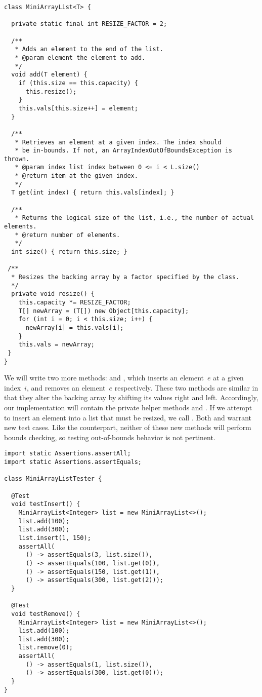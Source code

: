 \enlargethispage{-2\baselineskip}
\begin{lstlisting}[language=MyJava]
class MiniArrayList<T> {

  private static final int RESIZE_FACTOR = 2;

  /**
   * Adds an element to the end of the list.
   * @param element the element to add.
   */
  void add(T element) {
    if (this.size == this.capacity) { 
      this.resize(); 
    }
    this.vals[this.size++] = element;
  }

  /**
   * Retrieves an element at a given index. The index should
   * be in-bounds. If not, an ArrayIndexOutOfBoundsException is thrown.
   * @param index list index between 0 <= i < L.size()
   * @return item at the given index.
   */
  T get(int index) { return this.vals[index]; }

  /**
   * Returns the logical size of the list, i.e., the number of actual elements.
   * @return number of elements.
   */
  int size() { return this.size; }

 /**
  * Resizes the backing array by a factor specified by the class.
  */
  private void resize() {
    this.capacity *= RESIZE_FACTOR;
    T[] newArray = (T[]) new Object[this.capacity];
    for (int i = 0; i < this.size; i++) { 
      newArray[i] = this.vals[i]; 
    }
    this.vals = newArray;
 }
}
\end{lstlisting}

We will write two more methods:  and , which inserts an element~$e$ at a given index~$i$, and removes an element~$e$ respectively. 
These two methods are similar in that they alter the backing array by shifting its values right and left. 
Accordingly, our implementation will contain the private helper methods  and . 
If we attempt to insert an element into a list that must be resized, we call . 
Both  and  warrant new test cases.
Like the  counterpart, neither of these new methods will perform bounds checking, so testing out-of-bounds behavior is not pertinent.

\begin{lstlisting}[language=MyJava]
import static Assertions.assertAll;
import static Assertions.assertEquals;

class MiniArrayListTester {

  @Test
  void testInsert() {
    MiniArrayList<Integer> list = new MiniArrayList<>();
    list.add(100);
    list.add(300);
    list.insert(1, 150);
    assertAll(
      () -> assertEquals(3, list.size()),
      () -> assertEquals(100, list.get(0)),
      () -> assertEquals(150, list.get(1)),
      () -> assertEquals(300, list.get(2)));
  }

  @Test
  void testRemove() {
    MiniArrayList<Integer> list = new MiniArrayList<>();
    list.add(100);
    list.add(300);
    list.remove(0);
    assertAll(
      () -> assertEquals(1, list.size()),
      () -> assertEquals(300, list.get(0)));
  }
}
\end{lstlisting}

